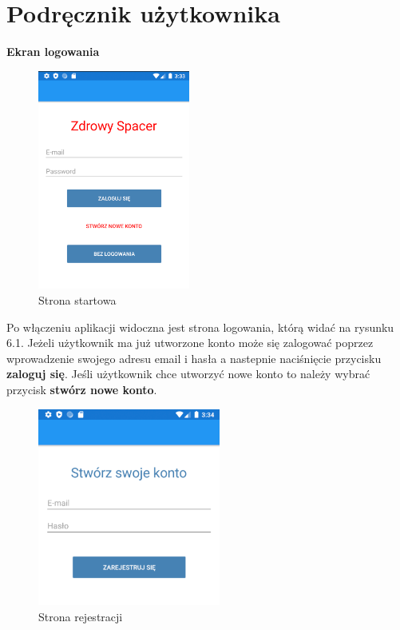	\newpage
\section{Podręcznik użytkownika}  %
\textbf{Ekran logowania}

\begin{figure}[!htb]
	\begin{center}
		\includegraphics[width=5cm]{rys/login.png}
		\caption{Strona startowa}
		\label{rys:rysunek041}
	\end{center}
\end{figure}
 
Po włączeniu aplikacji widoczna jest strona logowania, którą widać na rysunku 6.1. Jeżeli użytkownik ma już utworzone konto może się zalogować poprzez wprowadzenie swojego adresu email i hasła a nastepnie naciśnięcie przycisku \textbf{zaloguj się}. Jeśli użytkownik chce utworzyć nowe konto to należy wybrać przycisk \textbf{stwórz nowe konto}. \newline

\begin{figure}[!htb]
	\begin{center}
		\includegraphics[width=6cm]{rys/register.png}
		\caption{Strona rejestracji}
		\label{rys:rysunek042}
	\end{center}
\end{figure}

